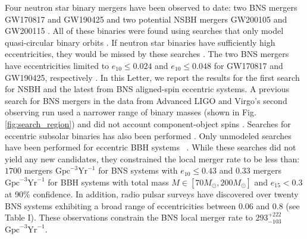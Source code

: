 Four neutron star binary mergers have been observed to date: two BNS mergers GW170817 \cite{LIGOScientific:2017vwq} and GW190425 \cite{LIGOScientific:2020aai} and two potential NSBH mergers GW200105 and GW200115 \cite{LIGOScientific:2021qlt}. All of these binaries were found using searches that only model quasi-circular binary orbits \cite{Messick:2016aqy,Aubin:2020goo,Allen:2005fk,Usman:2015kfa}. If neutron star binaries have sufficiently high eccentricities, they would be missed by these searches \cite{Huerta:2013qb,Lenon:2021zac}.   The two BNS mergers have eccentricities limited to $e_{10} \leq 0.024$ and $e_{10} \leq 0.048$ for GW170817 and GW190425, respectively \cite{Lenon:2020oza}. 
In this Letter, we report the results for the first search for NSBH and the latest from BNS aligned-spin eccentric systems. A previous search for BNS mergers in the data from Advanced LIGO and Virgo's second observing run used a narrower range of binary masses (shown in Fig. \ref{fig:search_region}) and did not account component-object spins \cite{Nitz:2019spj}. Searches for eccentric subsolar binaries has also been performed \cite{Nitz:2021vqh,Wang:2021qsu}. Only unmodeled searches have been performed for eccentric BBH systems ~\cite{LIGOScientific:2019dag, LIGOScientific:2023lpe, Pal:2023dyg}. While these searches did not yield any new candidates, they constrained the local merger rate to be less than: $1700$ mergers $\text{Gpc}^{-3} \text{Yr}^{-1}$ for BNS systems with $e_{10} \leq 0.43$ and $0.33$ mergers $\text{Gpc}^{-3} \text{Yr}^{-1}$ for BBH systems with total mass $M \in [70M_{\odot},200M_{\odot}]$ and $e_{15} < 0.3$ at 90\% confidence. In addition, radio pulsar surveys have discovered over twenty BNS systems exhibiting a broad range of eccentricities between 0.06 and 0.8 \cite{Bernadich:2023uru} (see Table I). These observations constrain the BNS local merger rate to $293^{+222}_{-103}$ $\text{Gpc}^{-3} \text{Yr}^{-1}$.


